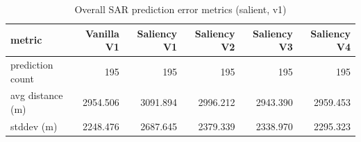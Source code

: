 \begin{table}[ht]
\centering
\caption{Overall SAR prediction error metrics (salient, v1)}
\label{tab:sar-overall-errors-salient,-v1}
\begin{tabular}{lrrrrr}
\hline
metric & Vanilla V1 & Saliency V1 & Saliency V2 & Saliency V3 & Saliency V4 \\
\hline
prediction count & 195 & 195 & 195 & 195 & 195 \\
avg distance (m) & 2954.506 & 3091.894 & 2996.212 & 2943.390 & 2959.453 \\
stddev (m) & 2248.476 & 2687.645 & 2379.339 & 2338.970 & 2295.323 \\
\hline
\end{tabular}
\end{table}
